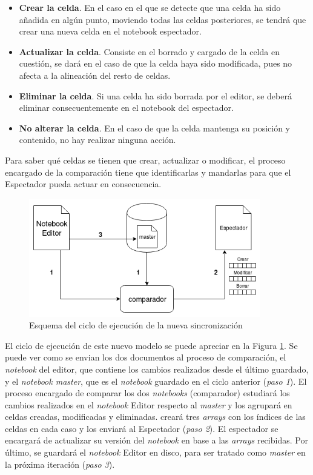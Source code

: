 \documentclass[11pt,spanish,listoffigures]{tfgetsinf}
\begin{document}
\begin{itemize}

\item \textbf{Crear la celda}. En el caso en el que se detecte que una celda ha sido añadida en algún punto, moviendo todas las celdas posteriores, se tendrá que crear una nueva celda en el notebook espectador.

\item \textbf{Actualizar la celda}. Consiste en el borrado y cargado de la celda en cuestión, se dará en el caso de que la celda haya sido modificada, pues no afecta a la alineación del resto de celdas.

\item \textbf{Eliminar la celda}. Si una celda ha sido borrada por el editor, se deberá eliminar consecuentemente en el notebook del espectador.

\item \textbf{No alterar la celda}. En el caso de que la celda mantenga su posición y contenido, no hay realizar ninguna acción.

\end{itemize}

Para saber qué celdas se tienen que crear, actualizar o modificar, el proceso encargado de la comparación tiene que identificarlas y mandarlas para que el Espectador pueda actuar en consecuencia. 

\begin{figure}[H]
	\centering
  	\includegraphics[width=0.9\textwidth]{nueva-sincro.png}
  	\caption{Esquema del ciclo de ejecución de la nueva sincronización}
  	\label{fig:new-sync}
\end{figure}

El ciclo de ejecución de este nuevo modelo se puede apreciar en la Figura \ref{fig:new-sync}. Se puede ver como se envian los dos documentos al proceso de comparación, el \textit{notebook} del editor, que contiene los cambios realizados desde el último guardado, y el \textit{notebook master}, que es el \textit{notebook} guardado en el ciclo anterior (\textit{paso 1}). El proceso encargado de comparar los dos \textit{notebooks} (comparador) estudiará los cambios realizados en el \textit{notebook} Editor respecto al \textit{master} y los agrupará en celdas creadas, modificadas y eliminadas. creará tres \textit{arrays} con los índices de las celdas en cada caso y los enviará al Espectador (\textit{paso 2}). El espectador se encargará de actualizar su versión del \textit{notebook} en base a las \textit{arrays} recibidas. Por último, se guardará el \textit{notebook} Editor en disco, para ser tratado como \textit{master} en la próxima iteración (\textit{paso 3}).
\end{document}
